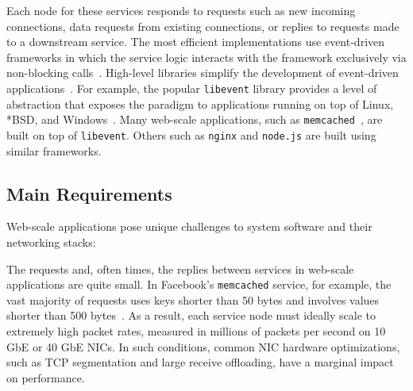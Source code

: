 Each node for these services responds to requests such as new incoming
connections, data requests from existing connections, or replies to
requests made to a downstream service.  The most efficient
implementations use event-driven frameworks in which the service logic
interacts with the framework exclusively via non-blocking
calls~\cite{DBLP:conf/usenix/PaiDZ99,DBLP:conf/sosp/WelshCB01}. %
High-level libraries simplify the development of event-driven
applications~\cite{provos2003libevent,libev,libuv}.  For example, the
popular \texttt{libevent} library provides a level of abstraction that
exposes the paradigm to applications running on top of Linux, *BSD,
and Windows~\cite{provos2003libevent}. Many web-scale applications,
such as \texttt{memcached}~\cite{url:memcached}, are built on top of
\texttt{libevent}.  Others such as \texttt{nginx} and \texttt{node.js} are built using
similar frameworks.


\subsection{Main Requirements}
\label{sec:motivation:challenges}

Web-scale applications pose unique challenges to system
software and their networking stacks:


 The requests and, often times, the
replies between services in web-scale applications are quite small. In
Facebook's \texttt{memcached} service, for example, the vast majority
of requests uses keys shorter than 50 bytes and involves values shorter
than 500 bytes~\cite{Atikoglu:2012:WAL}. As a result, each service
node must ideally scale to extremely high packet rates, measured in
millions of packets per second on 10 GbE or 40 GbE NICs.  In such
conditions, common NIC hardware optimizations, such as TCP
segmentation and large receive offloading, have a marginal impact on
performance.

